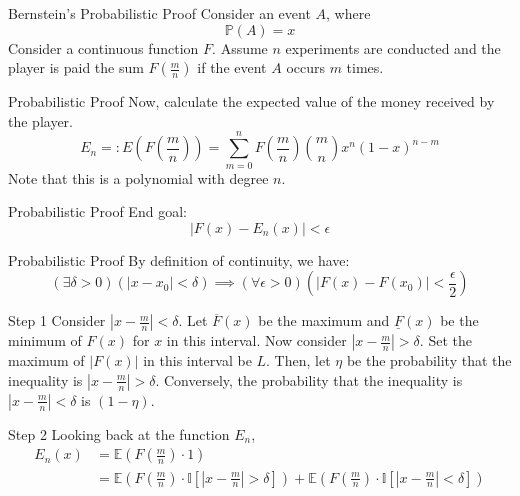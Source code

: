 \documentclass[mathserif,serif]{beamer}
\begin{document}
\begin{frame}{Bernstein's Probabilistic Proof}
Consider an event $A$, where
$$\mathbb{P}(A)=x$$
Consider a continuous function $F$.
\newline 
Assume $n$ experiments are conducted and the player is paid the sum $F(\frac{m}{n})$ if the event $A$ occurs $m$ times.    
\end{frame}

\begin{frame}{Probabilistic Proof}
Now, calculate the expected value of the money received by the player.
\begin{equation*}
      E_n =:E(F(\frac{m}{n})) = \sum_{m=0}^{n} F \left( \frac{m}{n} \right) \binom{m}{n} x^n (1-x)^{n-m}
\end{equation*}
Note that this is a polynomial with degree $n$.
\end{frame}

\begin{frame}{Probabilistic Proof}
End goal:
\begin{equation*}
    |F(x)-E_n(x)|<\epsilon
\end{equation*}
\end{frame}

\begin{frame}{Probabilistic Proof}
By definition of continuity, we have:
\begin{equation*}
    (\exists\delta>0)(|x-x_0|<\delta)\implies(\forall\epsilon>0)(|F(x)-F(x_0)|<\frac{\epsilon}{2})
\end{equation*}
\end{frame}

\begin{frame}{Step 1}
Consider $|x-\frac{m}{n}|<\delta$.
\newline
Let $\overline{F}(x)$ be the maximum and $\underline{F}(x)$ be the minimum of $F(x)$ for $x$ in this interval.
\newline
Now consider $|x-\frac{m}{n}|>\delta$.
\newline
Set the maximum of $|F(x)|$ in this interval be $L$.
\newline
Then, let $\eta$ be the probability that the inequality is $|x-\frac{m}{n}|>\delta$. Conversely, the probability that the inequality is $|x-\frac{m}{n}|<\delta$ is $(1-\eta)$.
\end{frame}

\begin{frame}{Step 2}
Looking back at the function $E_n$,
\begin{align*}
    E_n(x) &= \mathbb{E}\left(F\left(\frac{m}{n}\right)\cdot1\right) \\
    &= \mathbb{E}\left(F\left(\frac{m}{n}\right)\cdot \mathbb{I}\left[|x-\frac{m}{n}|>\delta\right]\right) + \mathbb{E}\left(F\left(\frac{m}{n}\right)\cdot \mathbb{I}\left[|x-\frac{m}{n}|<\delta\right]\right)\\
\end{align*}
\end{frame}
\end{document}
